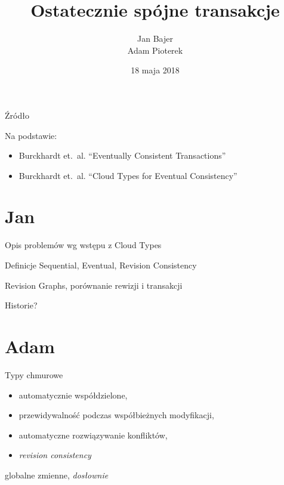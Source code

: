 \documentclass{beamer}
\title{Ostatecznie spójne transakcje}
\date{18 maja 2018}
\author{Jan Bajer\\Adam Pioterek}
\begin{document}
\begin{frame}
\titlepage{}
\end{frame}

\begin{frame}{Źródło}
    \begin{card}
        Na podstawie:
        \begin{itemize}
            \item Burckhardt et.\ al. “Eventually Consistent Transactions”
            \item Burckhardt et.\ al. “Cloud Types for Eventual Consistency”
        \end{itemize}
    \end{card}
\end{frame}

\section{Jan}

\begin{frame}{Opis problemów wg wstępu z Cloud Types}
\end{frame}

\begin{frame}{Definicje Sequential, Eventual, Revision Consistency}
\end{frame}

\begin{frame}{Revision Graphs, porównanie rewizji i transakcji}
\end{frame}

\begin{frame}{Historie?}
\end{frame}

\section{Adam}

\begin{frame}[fragile]{Typy chmurowe}
    \begin{card}
        \begin{itemize}[<+->]
            \item automatycznie współdzielone,
            \item przewidywalność podczas współbieżnych modyfikacji,
            \item automatyczne rozwiązywanie konfliktów,
            \item \textit{revision consistency}
        \end{itemize}
    \end{card}
     {
        \begin{card}
            globalne zmienne, \textit{dosłownie}
        \end{card}
    }
\end{frame}
\end{document}
